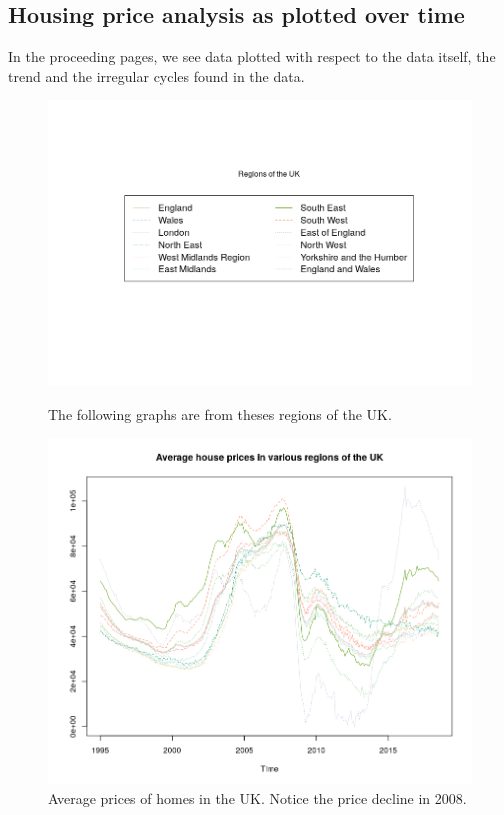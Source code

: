\documentclass[letterpaper]{scrartcl}
\begin{document}
    \subsection*{\color{triton_green}Housing price analysis as plotted over time}
    In the proceeding pages, we see data plotted with respect to the data itself, the trend and the irregular cycles found in the data.
        \begin{figure}[H]
            \centering
            \caption{The following graphs are from theses regions of the UK.}
            \includegraphics[scale = 0.6]{Legend.png}
            \label{fig:my_label}
        \end{figure}

        \begin{figure}[H]
            \centering
            \includegraphics[scale = 0.6]{HPFilterDataNoTrendNoCycle.png}
            \caption{Average prices of homes in the UK. Notice the price decline in 2008.}
            \label{fig:my_label}
        \end{figure}
        
\end{document}
